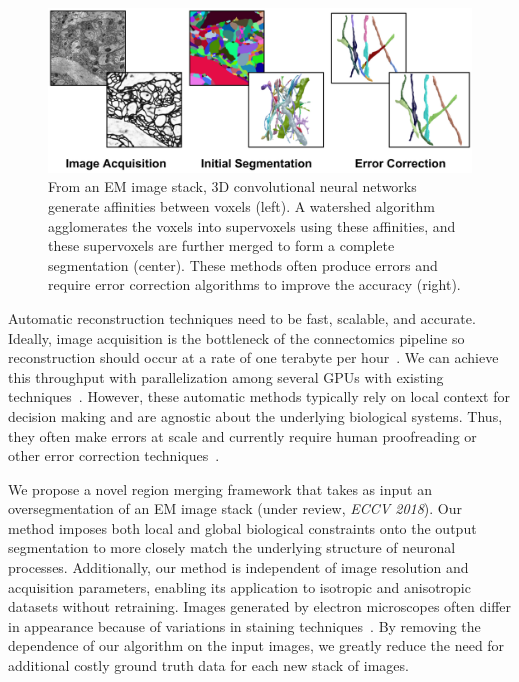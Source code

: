 \begin{figure}
	\includegraphics[width=\linewidth]{./figures/proposal-header.png}
	\caption{From an EM image stack, 3D convolutional neural networks generate affinities between voxels (left). A watershed algorithm agglomerates the voxels into supervoxels using these affinities, and these supervoxels are further merged to form a complete segmentation (center). These methods often produce errors and require error correction algorithms to improve the accuracy (right).}
	\label{fig:overview}
\end{figure}


Automatic reconstruction techniques need to be fast, scalable, and accurate.
Ideally, image acquisition is the bottleneck of the connectomics pipeline so reconstruction should occur at a rate of one terabyte per hour~\cite{haehn2017scalable}.
We can achieve this throughput with parallelization among several GPUs with existing techniques~\cite{funke2017deep,parag2017anisotropic}.
However, these automatic methods typically rely on local context for decision making and are agnostic about the underlying biological systems.
Thus, they often make errors at scale and currently require human proofreading or other error correction techniques~\cite{haehn2017guided,error_correction_using_CNN}. 

We propose a novel region merging framework that takes as input an oversegmentation of an EM image stack (under review, \textit{ECCV 2018}).
Our method imposes both local and global biological constraints onto the output segmentation to more closely match the underlying structure of neuronal processes.
Additionally, our method is independent of image resolution and acquisition parameters, enabling its application to isotropic and anisotropic datasets without retraining.
Images generated by electron microscopes often differ in appearance because of variations in staining techniques~\cite{briggman2012volume}.
By removing the dependence of our algorithm on the input images, we greatly reduce the need for additional costly ground truth data for each new stack of images.
